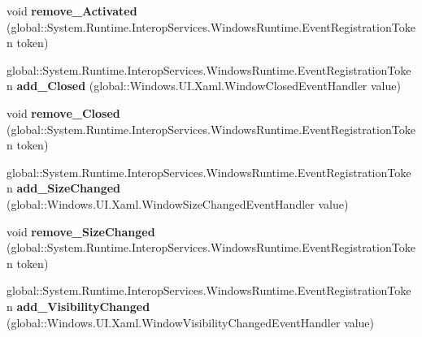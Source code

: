 \begin{DoxyCompactItemize}
\item 
\mbox{\label{interface_windows_1_1_u_i_1_1_xaml_1_1_i_window_a165e8521d9e128e4b62802835b9f4d8a}} 
void {\bfseries remove\+\_\+\+Activated} (global\+::\+System.\+Runtime.\+Interop\+Services.\+Windows\+Runtime.\+Event\+Registration\+Token token)
\item 
\mbox{\label{interface_windows_1_1_u_i_1_1_xaml_1_1_i_window_a11fa463419c747132c34f2ec0ce3a69c}} 
global\+::\+System.\+Runtime.\+Interop\+Services.\+Windows\+Runtime.\+Event\+Registration\+Token {\bfseries add\+\_\+\+Closed} (global\+::\+Windows.\+U\+I.\+Xaml.\+Window\+Closed\+Event\+Handler value)
\item 
\mbox{\label{interface_windows_1_1_u_i_1_1_xaml_1_1_i_window_a12d963db8f8246dfdbcb32e9414bf060}} 
void {\bfseries remove\+\_\+\+Closed} (global\+::\+System.\+Runtime.\+Interop\+Services.\+Windows\+Runtime.\+Event\+Registration\+Token token)
\item 
\mbox{\label{interface_windows_1_1_u_i_1_1_xaml_1_1_i_window_a8ef20b7e8d3446f546b375a981c2c5e1}} 
global\+::\+System.\+Runtime.\+Interop\+Services.\+Windows\+Runtime.\+Event\+Registration\+Token {\bfseries add\+\_\+\+Size\+Changed} (global\+::\+Windows.\+U\+I.\+Xaml.\+Window\+Size\+Changed\+Event\+Handler value)
\item 
\mbox{\label{interface_windows_1_1_u_i_1_1_xaml_1_1_i_window_a3391a8ee3dfb84c08f6c1a4aaf2a93d8}} 
void {\bfseries remove\+\_\+\+Size\+Changed} (global\+::\+System.\+Runtime.\+Interop\+Services.\+Windows\+Runtime.\+Event\+Registration\+Token token)
\item 
\mbox{\label{interface_windows_1_1_u_i_1_1_xaml_1_1_i_window_a5f04e7117048e66860719c075ccd35aa}} 
global\+::\+System.\+Runtime.\+Interop\+Services.\+Windows\+Runtime.\+Event\+Registration\+Token {\bfseries add\+\_\+\+Visibility\+Changed} (global\+::\+Windows.\+U\+I.\+Xaml.\+Window\+Visibility\+Changed\+Event\+Handler value)
\item 
\mbox{\label{interface_windows_1_1_u_i_1_1_xaml_1_1_i_window_a84975e25e4da813954279a1795ef9d53}} 

\end{DoxyCompactItemize}
